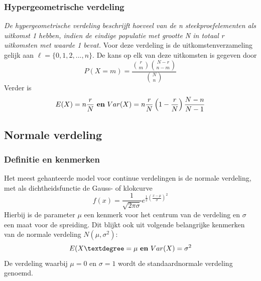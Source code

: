 \documentclass[titlepage]{article}
\numberwithin{equation}{section}
\begin{document}
\subsubsection{Hypergeometrische verdeling}
\emph{De hypergeometrische verdeling beschrijft hoeveel van de n steekproefelementen als uitkomst 1 hebben, indien de eindige populatie met grootte N in totaal r uitkomsten met waarde 1 bevat.}\newline\newline
Voor deze verdeling is de uitkomstenverzameling gelijk aan $\ell = \{0, 1, 2, ... , n\}$. De kans op elk van deze uitkomsten is gegeven door
\begin{equation*}
	P(X=m) = \frac{\binom{r}{m}\binom{N-r}{n-m}}{\binom{N}{n}}
\end{equation*}
Verder is
\begin{equation*}
	E(X) = n \frac{r}{N} \text{ \textbf{en} } Var(X) = n \frac{r}{N} \left(1-\frac{r}{N} \right)\frac{N-n}{N-1}
\end{equation*}
\subsection{Normale verdeling}
\subsubsection{Definitie en kenmerken}
Het meest gehanteerde model voor continue verdelingen is de normale verdeling, met als dichtheidsfunctie de Gauss- of klokcurve
\begin{equation}
	f(x) = \frac{1}{\sqrt{2\pi \sigma}} e^{\frac{1}{2}\left(\frac{x-\mu}{\sigma}\right)^2}
	\label{4.9}
\end{equation}
Hierbij is de parameter $\mu$ een kenmerk voor het centrum van de verdeling en $\sigma$ een maat voor de spreiding. Dit blijkt ook uit volgende belangrijke kenmerken van de normale verdeling $N(\mu ,\sigma^2)$:
\begin{equation}
	E(X° = \mu \text{ \textbf{en} } Var(X) = \sigma^2
	\label{4.10}
\end{equation}
De verdeling waarbij $\mu = 0$ en $\sigma = 1$ wordt de standaardnormale verdeling genoemd.
\end{document}
